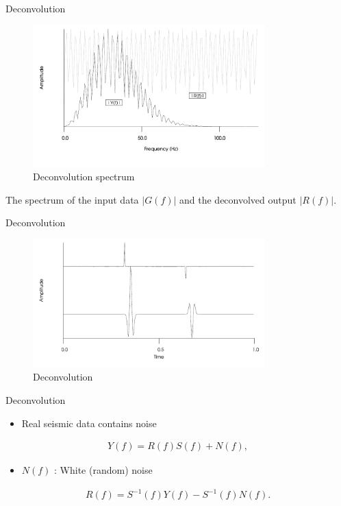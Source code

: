 \documentclass[xcolor=dvipsnames,notes]{beamer}
\begin{document}
%
\begin{frame}{Deconvolution}
\begin{figure}
\includegraphics[width=0.8\textwidth]{Fig/fdecon2-spectr}
\caption{Deconvolution spectrum}
\end{figure}
%
The spectrum of the input data $|G(f)|$ and the
         deconvolved output $|R(f)|$.
%
\end{frame}
%
\begin{frame}{Deconvolution}
\sf\Large
%
\begin{figure}[h]
\includegraphics[width=0.8\textwidth]{Fig/fdecon2.pdf}
\caption{Deconvolution}
\label{fig:fdecon2}
\end{figure}
\end{frame}
%
\begin{frame}{Deconvolution}
\sf\Large
\begin{itemize}
 \item Real seismic data contains noise
\end{itemize}
%
\begin{eqnarray}
  Y(f) = R(f) S(f) + N(f),
      \label{eq:cmodel-four-noise}
\end{eqnarray}
%
\begin{itemize}
 \item $N(f)$ : White (random) noise
\end{itemize}
%
\begin{eqnarray}
  R(f) = S^{-1}(f) Y(f) - S^{-1}(f)N(f).
      \label{eq:refl-noise}
\end{eqnarray}
%
\end{frame}
\end{document}
